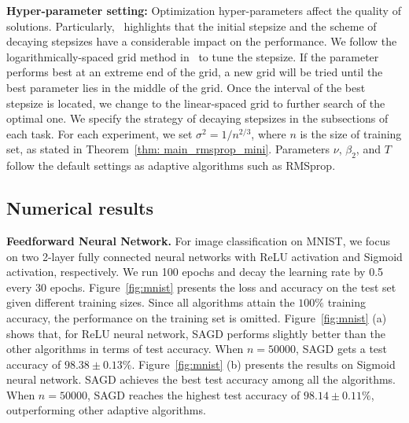 \documentclass[11pt]{article}
\begin{document}
\textbf{Hyper-parameter setting:} 
Optimization hyper-parameters affect the quality of solutions. 
Particularly,~\citet{wiro17} highlights that the initial stepsize and the scheme of decaying stepsizes have a considerable impact on the performance. 
We follow the logarithmically-spaced grid method in~\citet{wiro17} to tune the stepsize. 
If the parameter performs best at an extreme end of the grid, a new grid will be tried until the best parameter lies in the middle of the grid. 
Once the interval of the best stepsize is located, we change to the linear-spaced grid to further search of the optimal one. 
We specify the strategy of decaying stepsizes in the subsections of each task. 
For each experiment, we set $\sigma^2 = 1/n^{2/3}$, where $n$ is the size of training set, as stated in Theorem~\ref{thm: main_rmsprop_mini}. 
Parameters $\nu$, $\beta_2$, and $T$ follow the default settings as adaptive algorithms such as RMSprop. 

\vspace{-0.05in}
\subsection{Numerical results}\label{subsec:results}
\vspace{-0.05in}
\textbf{Feedforward Neural Network.}
For image classification on MNIST, we focus on two 2-layer fully connected neural networks with ReLU activation and Sigmoid activation, respectively. We run 100 epochs and decay the learning rate by 0.5 every 30 epochs. 
Figure~\ref{fig:mnist} presents the loss and accuracy on the test set given different training sizes. Since all algorithms attain the $100\%$ training accuracy, the performance on the training set is omitted. 
Figure~\ref{fig:mnist} (a) shows that, for ReLU neural network, 
\textsc{SAGD} performs slightly better than the other algorithms in terms of test accuracy. When $n =50000$, \textsc{SAGD} gets a test accuracy of $98.38 \pm 0.13 \%$. 
Figure~\ref{fig:mnist} (b) presents the results on Sigmoid neural network. \textsc{SAGD} achieves the best test accuracy among all the algorithms. When $n =50000$, \textsc{SAGD} reaches the highest test accuracy of $98.14 \pm 0.11 \%$, outperforming other adaptive algorithms.
\end{document}
